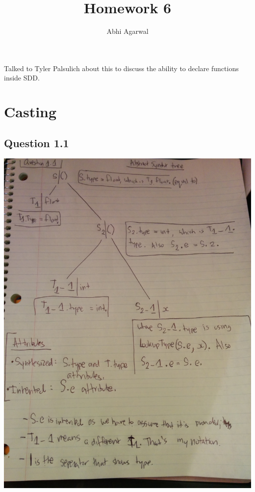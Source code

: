 \documentclass[11pt, oneside]{article}   	%
\title{Homework 6}
\author{Abhi Agarwal}
\date{}
\begin{document}
\maketitle

\par Talked to Tyler Palsulich about this to discuss the ability to declare functions inside SDD.

\section{Casting}
\subsection*{Question 1.1}
\includegraphics[scale=0.19]{IMG_20141011_142752.jpg}

\newpage
\end{document}
